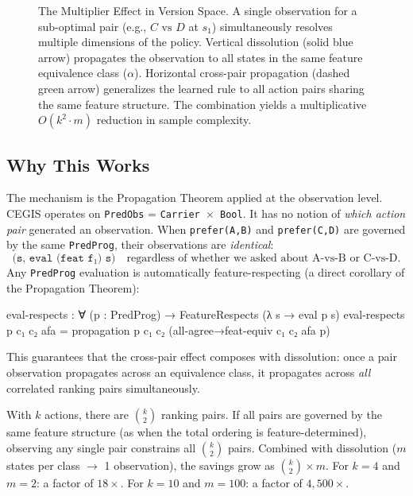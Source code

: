 \begin{figure}[H]
\caption{The Multiplier Effect in Version Space. A single observation for a sub-optimal pair (e.g., $C \text{ vs } D$ at $s_1$) simultaneously resolves multiple dimensions of the policy. Vertical dissolution (solid blue arrow) propagates the observation to all states in the same feature equivalence class ($\alpha$). Horizontal cross-pair propagation (dashed green arrow) generalizes the learned rule to all action pairs sharing the same feature structure. The combination yields a multiplicative $O(k^2 \cdot m)$ reduction in sample complexity.}
\label{fig:cross-pair-matrix}
\end{figure}

\subsection{Why This Works}

The mechanism is the Propagation Theorem applied at the observation level.  CEGIS operates on \texttt{PredObs} = \texttt{Carrier $\times$ Bool}.  It has no notion of \emph{which action pair} generated an observation.  When \texttt{prefer(A,B)} and \texttt{prefer(C,D)} are governed by the same \texttt{PredProg}, their observations are \emph{identical}:
\[
\texttt{(s, eval (feat f₁) s)} \quad\text{regardless of whether we asked about A-vs-B or C-vs-D.}
\]
Any \texttt{PredProg} evaluation is automatically feature-respecting (a direct corollary of the Propagation Theorem):

\begin{spec}
eval-respects : ∀ (p : PredProg) → FeatureRespects (λ s → eval p s)
eval-respects p c₁ c₂ afa =
  propagation p c₁ c₂ (all-agree→feat-equiv c₁ c₂ afa p)
\end{spec}

\noindent This guarantees that the cross-pair effect composes with dissolution: once a pair observation propagates across an equivalence class, it propagates across \emph{all} correlated ranking pairs simultaneously.

\begin{remark}[Scaling]
With $k$ actions, there are $\binom{k}{2}$ ranking pairs.  If all pairs are governed by the same feature structure (as when the total ordering is feature-determined), observing any single pair constrains all $\binom{k}{2}$ pairs.  Combined with dissolution ($m$ states per class $\to$ 1 observation), the savings grow as $\binom{k}{2} \times m$.  For $k = 4$ and $m = 2$: a factor of $18\times$.  For $k = 10$ and $m = 100$: a factor of $4{,}500\times$.
\end{remark}

